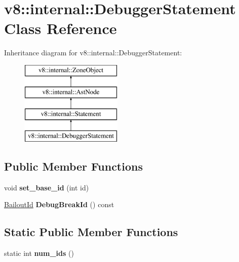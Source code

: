 \hypertarget{classv8_1_1internal_1_1_debugger_statement}{}\section{v8\+:\+:internal\+:\+:Debugger\+Statement Class Reference}
\label{classv8_1_1internal_1_1_debugger_statement}
Inheritance diagram for v8\+:\+:internal\+:\+:Debugger\+Statement\+:\begin{figure}[H]
\begin{center}
\leavevmode
\includegraphics[height=4.000000cm]{classv8_1_1internal_1_1_debugger_statement}
\end{center}
\end{figure}
\subsection*{Public Member Functions}
\begin{DoxyCompactItemize}
\item 
void {\bfseries set\+\_\+base\+\_\+id} (int id)\hypertarget{classv8_1_1internal_1_1_debugger_statement_a537a9af84eba67203296907a8b1d77c2}{}\label{classv8_1_1internal_1_1_debugger_statement_a537a9af84eba67203296907a8b1d77c2}

\item 
\hyperlink{classv8_1_1internal_1_1_bailout_id}{Bailout\+Id} {\bfseries Debug\+Break\+Id} () const \hypertarget{classv8_1_1internal_1_1_debugger_statement_aa8f43d834aeffade55c4ad578f2509f3}{}\label{classv8_1_1internal_1_1_debugger_statement_aa8f43d834aeffade55c4ad578f2509f3}

\end{DoxyCompactItemize}
\subsection*{Static Public Member Functions}
\begin{DoxyCompactItemize}
\item 
static int {\bfseries num\+\_\+ids} ()\hypertarget{classv8_1_1internal_1_1_debugger_statement_a6583be07c43eb231a09d60fcdc4c2ecf}{}\label{classv8_1_1internal_1_1_debugger_statement_a6583be07c43eb231a09d60fcdc4c2ecf}

\end{DoxyCompactItemize}

